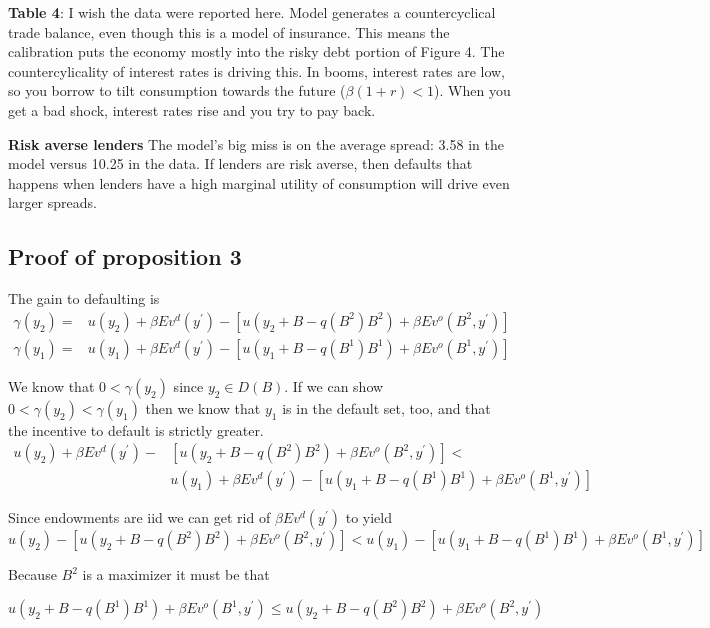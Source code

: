 \documentclass[11pt, pdftex]{article}
\begin{document}
\textbf{Table 4}: I wish the data were reported here. Model generates a countercyclical trade balance, even though this is a model of insurance. This means the calibration puts the economy mostly into the risky debt portion of Figure 4.  The countercylicality of interest rates is driving this.  In booms, interest rates are low, so you borrow to tilt consumption towards the future ($\beta(1+r)<1$). When you get a bad shock, interest rates rise and you try to pay back.



\textbf{Risk averse lenders} The model's big miss is on the average spread: 3.58 in the model versus 10.25 in the data.  If lenders are risk averse, then defaults that happens when lenders have a high marginal utility of consumption will drive even larger spreads.

\newpage
\subsection*{Proof of proposition 3}


The gain to defaulting is
\begin{align*}
  \gamma(y_2) =& u(y_2)+\beta Ev^d(y^\prime) - \left[u(y_2+B-q(B^2)B^2)+ \beta Ev^o(B^2,y^\prime)\right]  \\
  \gamma(y_1)= & u(y_1)+\beta Ev^d(y^\prime)-\left[ u(y_1+B-q(B^1)B^1)+ \beta Ev^o(B^1,y^\prime)\right]
\end{align*}


We know that $0<\gamma(y_2)$ since $y_2\in D(B)$. If we can show $0<\gamma(y_2)< \gamma(y_1)$ then we know that $y_1$ is in the default set, too, and that the incentive to default is strictly greater.
\begin{align*}
u(y_2)+\beta Ev^d(y^\prime) -& \left[u(y_2+B-q(B^2)B^2) + \beta Ev^o(B^2,y^\prime)\right] <\\
  &u(y_1)+\beta Ev^d(y^\prime)  - \left[ u(y_1+B-q(B^1)B^1)+ \beta Ev^o(B^1,y^\prime)\right]
\end{align*}

Since endowments are iid we can get rid of $\beta Ev^d(y^\prime)$ to yield
\begin{equation}\label{eq:gain1}
u(y_2) - \left[u(y_2+B-q(B^2)B^2)+ \beta Ev^o(B^2,y^\prime)\right] <  u(y_1)  - \left[u(y_1+B-q(B^1)B^1)+ \beta Ev^o(B^1,y^\prime)\right]
\end{equation}

Because $B^2$ is a maximizer it must be that

\begin{equation*}
  u(y_2+B-q(B^1)B^1)+\beta Ev^o(B^1,y^\prime) \leq u(y_2+B-q(B^2)B^2)+\beta Ev^o(B^2,y^\prime)
  \end{equation*}
\end{document}
